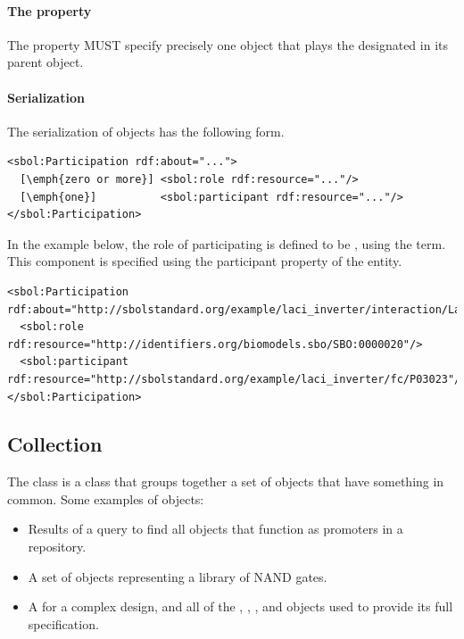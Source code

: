 \paragraph{The  property}\label{sec:participant}

The  property MUST specify precisely one  object that plays the designated  in its parent  object.


\paragraph{Serialization}

The serialization of  objects has the following form.
\begin{lstlisting}
<sbol:Participation rdf:about="...">
  [\emph{zero or more}] <sbol:role rdf:resource="..."/>
  [\emph{one}]          <sbol:participant rdf:resource="..."/>
</sbol:Participation>
\end{lstlisting}

In the example below, the role of participating  is defined to be , using the  term. This component is specified using the participant property of the  entity.
\begin{lstlisting}
<sbol:Participation rdf:about="http://sbolstandard.org/example/laci_inverter/interaction/LacI_pLacI/participation/P03023">
  <sbol:role rdf:resource="http://identifiers.org/biomodels.sbo/SBO:0000020"/>
  <sbol:participant rdf:resource="http://sbolstandard.org/example/laci_inverter/fc/P03023"/>
</sbol:Participation>
\end{lstlisting}

\subsection {Collection}
\label{sec:Collection}
The  class is a class that groups together a set of  objects that have something in common. 
Some examples of  objects:
\begin{itemize}
\item Results of a query to find all  objects that function as promoters in a repository.
\item A set of  objects representing a library of NAND gates.
\item A  for a complex design, and all of the , , , and  objects used to provide its full specification.
\end{itemize}

